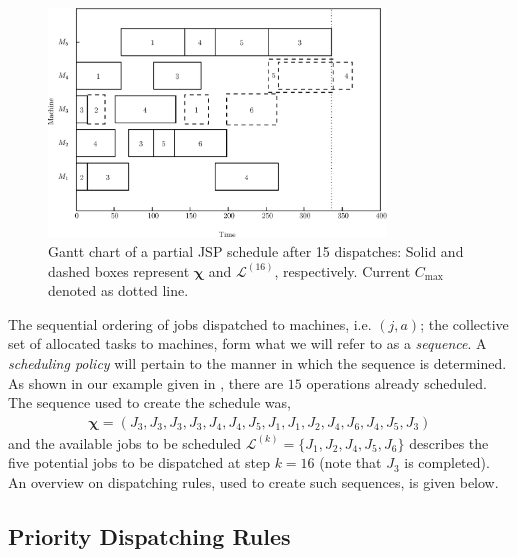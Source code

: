 \documentclass[smallextended]{svjour3}
\renewcommand{\vchi}{\bm \chi}
\begin{document}
\begin{figure}[t!]\centering
  \includegraphics[width=0.8\textwidth]{figures/jssp_example_nocolor.eps}
  \caption[Gantt chart of a partial JSP schedule]{Gantt chart of a
    partial JSP schedule after 15 dispatches: Solid and dashed boxes
    represent $\vchi$ and $\mathcal{L}^{(16)}$, respectively. Current
    $C_{\max}$ denoted as dotted line.}
  \label{fig:jssp:example}
\end{figure}
	
	
The sequential ordering of jobs dispatched to machines, i.e. $(j,a)$; the collective set of
allocated tasks to machines, form what we will refer to as a \emph{sequence}. A \emph{scheduling policy} will
pertain to the manner in which the sequence is determined.  As shown
in our example given in , there are $15$
operations already scheduled. The sequence used to create the schedule
was,
\begin{eqnarray}
  \vchi=\left(J_3,J_3,J_3,J_3,J_4,J_4,J_5,J_1,J_1,J_2,J_4,J_6,J_4,J_5,J_3\right)
\end{eqnarray}
and the available jobs to be scheduled
$\mathcal{L}^{(k)}=\{J_1,J_2,J_4,J_5,J_6\}$ describes the five potential jobs to be dispatched
at step $k=16$ (note that $J_3$ is completed). An overview on dispatching rules, used to create such sequences, is given below.
	
\subsection{Priority Dispatching Rules}
	
	
\end{document}
